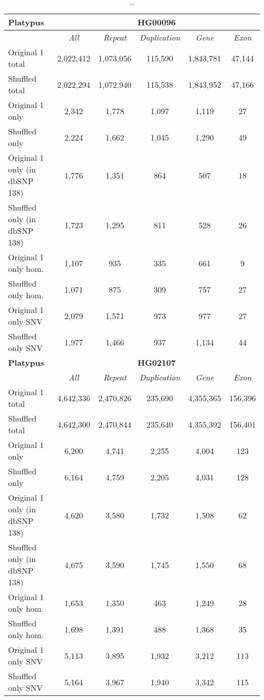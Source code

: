 \clearpage

\begin{table}[htb]
\caption{ .. }
\begin{center}
\begin{tabular}{|l|c||c|c|c|c|}
\hline
{\bf Platypus} & \multicolumn{5}{|c|}{\bf HG00096} \\
\hline
\cline{2-6}
{\bf} & {\it All} & {\it Repeat} & {\it Duplication} & {\it Gene} & {\it Exon} \\
\hline
Original 1 total & 2,022,412 & 1,073,056 & 115,590 & 1,843,781 & 47,144 \\
\hline
Shuffled total & 2,022,294 & 1,072,940 & 115,538 & 1,843,952 & 47,166 \\
\hline
Original 1 only & 2,342 & 1,778 & 1,097 & 1,119 & 27 \\
\hline
Shuffled only & 2,224 & 1,662 & 1,045 & 1,290 & 49 \\
\hline
Original 1 only (in dbSNP 138) & 1,776 & 1,351 & 864 & 507 & 18 \\
\hline
Shuffled only (in dbSNP 138) & 1,723 & 1,295 & 811 & 528 & 26 \\
\hline
Original 1 only hom. & 1,107 & 935 & 335 & 661 & 9 \\
\hline
Shuffled only hom. & 1,071 & 875 & 309 & 757 & 27 \\
\hline
Original 1 only SNV & 2,079 & 1,571 & 973 & 977 & 27 \\
\hline
Shuffled only SNV & 1,977 & 1,466 & 937 & 1,134 & 44 \\ 
\hline
\hline
{\bf Platypus} & \multicolumn{5}{|c|}{\bf HG02107} \\
\hline
\cline{2-6}
{\bf} & {\it All} & {\it Repeat} & {\it Duplication} & {\it Gene} & {\it Exon} \\
\hline
Original 1 total & 4,642,336 & 2,470,826 & 235,690 & 4,355,365 & 156,396 \\
\hline
Shuffled total & 4,642,300 & 2,470,844 & 235,640 & 4,355,392 & 156,401 \\
\hline
Original 1 only & 6,200 & 4,741 & 2,255 & 4,004 & 123 \\
\hline
Shuffled only & 6,164 & 4,759 & 2,205 & 4,031 & 128 \\
\hline
Original 1 only (in dbSNP 138) & 4,620 & 3,580 & 1,732 & 1,508 & 62 \\
\hline
Shuffled only (in dbSNP 138) & 4,675 & 3,590 & 1,745 & 1,550 & 68 \\
\hline
Original 1 only hom. & 1,653 & 1,350 & 463 & 1,249 & 28 \\
\hline
Shuffled only hom. & 1,698 & 1,391 & 488 & 1,368 & 35 \\
\hline
Original 1 only SNV & 5,113 & 3,895 & 1,932 & 3,212 & 113 \\
\hline
Shuffled only SNV & 5,164 & 3,967 & 1,940 & 3,342 & 115 \\ 
\hline
\end{tabular}
\end{center}
\label{tab:orig-vs-shuf-platypus}
\end{table}


